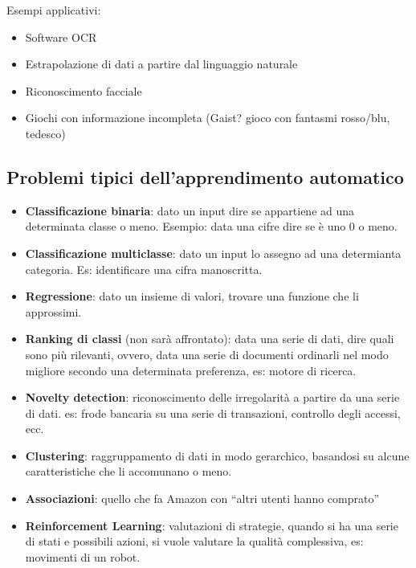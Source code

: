 Esempi applicativi:

\begin{itemize}
\item
  Software OCR
\item
  Estrapolazione di dati a partire dal linguaggio naturale
\item
  Riconoscimento facciale
\item
  Giochi con informazione incompleta (Gaist? gioco con fantasmi
  rosso/blu, tedesco)
\end{itemize}

\subsection{Problemi tipici dell'apprendimento automatico}\label{problemi-tipici-dellapprendimento-automatico}

\begin{itemize}
\item
  \textbf{Classificazione binaria}: dato un input dire se appartiene ad
  una determinata classe o meno. Esempio: data una cifre dire se è uno 0
  o meno.
\item
  \textbf{Classificazione multiclasse}: dato un input lo assegno ad una
  determianta categoria. Es: identificare una cifra manoscritta.
\item
  \textbf{Regressione}: dato un insieme di valori, trovare una funzione
  che li approssimi.
\item
  \textbf{Ranking di classi} (non sarà affrontato): data una serie di
  dati, dire quali sono più rilevanti, ovvero, data una serie di
  documenti ordinarli nel modo migliore secondo una determinata
  preferenza, es: motore di ricerca.
\item
  \textbf{Novelty detection}: riconoscimento delle irregolarità a
  partire da una serie di dati. es: frode bancaria su una serie di
  transazioni, controllo degli accessi, ecc.
\item
  \textbf{Clustering}: raggruppamento di dati in modo gerarchico,
  basandosi su alcune caratteristiche che li accomunano o meno.
\item
  \textbf{Associazioni}: quello che fa Amazon con ``altri utenti hanno
  comprato''
\item
  \textbf{Reinforcement Learning}: valutazioni di strategie, quando si
  ha una serie di stati e possibili azioni, si vuole valutare la qualità
  complessiva, es: movimenti di un robot.
\end{itemize}
